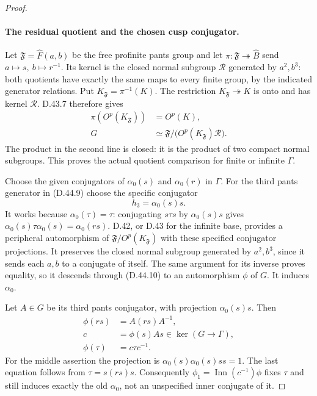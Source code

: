 \begin{proof}
\paragraph{The residual quotient and the chosen cusp conjugator.}
Let
\(\mathfrak F=\widehat F(a,b)\) be the free
profinite pants group and let
\(\pi:\mathfrak F\twoheadrightarrow\widehat B\)
send \(a\mapsto s,\ b\mapsto r^{-1}\).
Its kernel is the closed normal subgroup
\(\mathcal R\) generated by \(a^2,b^3\):
both quotients have exactly the same maps
to every finite group, by the indicated
generator relations.
Put \(K_{\mathfrak F}=\pi^{-1}(K)\).
The restriction
\(K_{\mathfrak F}\twoheadrightarrow K\)
is onto and has kernel \(\mathcal R\).
D.43.7 therefore gives
\[
 \begin{split}
 \pi(O^p(K_{\mathfrak F}))&=O^p(K),\\
 G&\simeq
 \mathfrak F/
       \bigl(O^p(K_{\mathfrak F})\mathcal R\bigr).
 \end{split}
 \tag{D.44.10}
\]
The product in the second line is closed:
it is the product of two compact normal
subgroups.
This proves the actual quotient comparison
for finite or infinite \(\Gamma\).

Choose the given conjugators of
\(\alpha_0(s)\) and \(\alpha_0(r)\)
in \(\Gamma\).
For the third pants generator in
\textup{(D.44.9)} choose the specific
conjugator
\[
                         h_3=\alpha_0(s)s .
 \tag{D.44.11}
\]
It works because \(\alpha_0(\tau)=\tau\):
conjugating \(s\tau s\) by
\(\alpha_0(s)s\) gives
\(\alpha_0(s)\tau\alpha_0(s)=\alpha_0(rs)\).
D.42, or D.43 for the infinite base,
provides a peripheral automorphism of
\(\mathfrak F/O^p(K_{\mathfrak F})\)
with these specified conjugator
projections.
It preserves the closed normal subgroup
generated by \(a^2,b^3\), since it sends
each \(a,b\) to a conjugate of itself.
The same argument for its inverse proves
equality, so it descends through
\textup{(D.44.10)} to an automorphism
\(\phi\) of \(G\).
It induces \(\alpha_0\).

Let \(A\in G\) be its third pants
conjugator, with projection
\(\alpha_0(s)s\).
Then
\[
 \begin{split}
 \phi(rs)&=A(rs)A^{-1},\\
 c&=\phi(s)A s\in\ker(G\to\Gamma),\\
 \phi(\tau)&=c\tau c^{-1}.
 \end{split}
 \tag{D.44.12}
\]
For the middle assertion the projection
is
\(\alpha_0(s)\alpha_0(s)ss=1\).
The last equation follows from
\(\tau=s(rs)s\).
Consequently
\(\phi_1=\operatorname{Inn}(c^{-1})\phi\)
fixes \(\tau\) and still induces exactly
the old \(\alpha_0\), not an unspecified
inner conjugate of it.


\end{proof}
